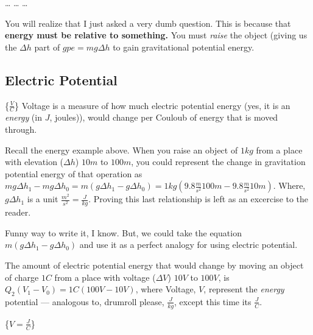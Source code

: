 \documentclass[letterpaper]{article}
\begin{document}
\ldots{} \ldots{} \ldots{}

You will realize that I just asked a very dumb question. This is because
that \textbf{energy must be relative to something.} You must \emph{raise} the object
(giving us the \(\Delta h\) part of \(gpe = mg\Delta h\) to gain
gravitational potential energy.

\subsection{Electric Potential}
\label{sec:org10eff37}
\{\(\frac{V}{C}\)\}
Voltage is a measure of how much electric potential energy (yes, it is
an \emph{energy} (in \(J\), joules)), would change per Couloub of energy that
is moved through.

Recall the energy example above. When you raise an object of \(1kg\)
from a place with elevation (\(\Delta h\)) \(10m\) to \(100m\), you
could represent the change in gravitation potential energy of that
operation as
\(mg \Delta h_1 - mg \Delta h_0 = m(g \Delta h_1-g \Delta h_0) = 1kg(9.8\frac{m}{s^2} 100m - 9.8\frac{m}{s^2} 10m)\).
Where, \(g\Delta h_1\) is a unit \(\frac{m^2}{s^2} = \frac{J}{kg}\).
Proving this last relationship is left as an excercise to the reader.

Funny way to write it, I know. But, we could take the equation
\(m(g \Delta h_1-g \Delta h_0)\) and use it as a perfect analogy for
using electric potential.

The amount of electric potential energy that would change by moving an
object of charge \(1C\) from a place with voltage (\(\Delta V\)) \(10V\)
to \(100V\), is \(Q_2(V_1-V_0) = 1C (100V-10V)\), where Voltage, \(V\),
represent the \emph{energy} potential --- analogous to, drumroll please,
\(\frac{J}{kg}\), except this time its \(\frac{J}{C}\).

\{\(V = \frac{J}{C}\)\}
\end{document}
